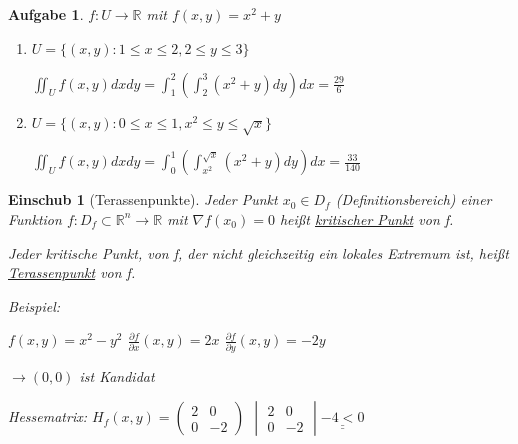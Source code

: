 \documentclass[12pt,a4paper]{scrreprt}
\newtheorem{aufg}[defi]{Aufgabe}
\newtheorem*{einschub}{Einschub}
\begin{document}
	\begin{aufg}
		$f:U\to\mathbb{R}$ mit $f(x,y)=x^2+y$

		\begin{enumerate}
			\item $U=\{(x,y):1 \leq x \leq 2, 2 \leq y \leq 3\}$
			

			$\iint_U f(x,y)dxdy=\int_1^2 \left(\int_2^3 (x^2+y) dy\right)dx = \frac{29}{6}$

			\item $U=\{(x,y):0 \leq x \leq 1, x^2 \leq y \leq \sqrt{x}\}$
			

			$\iint_U f(x,y)dxdy=\int_0^1 \left(\int_{x^2}^{\sqrt{x}} (x^2+y) dy\right)dx = \frac{33}{140}$
		\end{enumerate}
	\end{aufg}

	\begin{einschub}[Terassenpunkte]
		Jeder Punkt $x_0\in D_f$ (Definitionsbereich) einer Funktion $f:D_f\subset\mathbb{R}^n\to\mathbb{R}$ mit $\nabla f(x_0)=0$ heißt \underline{kritischer Punkt} von f.

		Jeder kritische Punkt, von f, der nicht gleichzeitig ein lokales Extremum ist, heißt \underline{Terassenpunkt} von f.

		Beispiel:

		$f(x,y)=x^2-y^2$	$\frac{\partial f}{\partial x}(x,y)=2x$	$\frac{\partial f}{\partial y}(x,y)=-2y$

		$\to (0,0)$ ist Kandidat

		Hessematrix: $H_f(x,y)=\begin{pmatrix}2 & 0 \\ 0 & -2\end{pmatrix}$ $\begin{vmatrix}2 & 0 \\ 0 & -2\end{vmatrix}\underline{\underline{-4<0}}$

	\end{einschub}
	
\end{document}
